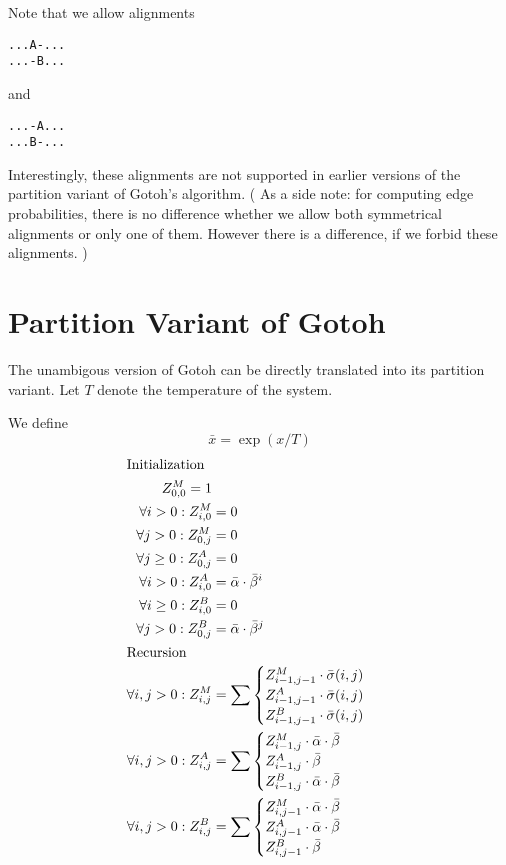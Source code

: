 \documentclass{article}
\begin{document}
Note that we allow alignments
\begin{verbatim}
...A-...
...-B...
\end{verbatim}
and
\begin{verbatim}
...-A...
...B-...
\end{verbatim}
Interestingly, these alignments are not supported in earlier versions of the
partition variant of Gotoh's algorithm. ( As a side note: for computing edge
probabilities, there is no difference whether we allow both symmetrical
alignments or only one of them. However there is a difference, if we forbid
these alignments. )

\section{Partition Variant of Gotoh}

The unambigous version of Gotoh can be directly translated into its partition
variant. Let $T$ denote the temperature of the system.

\newcommand{\ef}[1]{\bar#1}
We define
\begin{displaymath}
  \ef{x} = \exp(x/T)
\end{displaymath}
%
\begin{align*}
\intertext{Initialization}
Z^M_{0,0} = 1\\
\forall i>0: Z^M_{i,0} &= 0\\
\forall j>0: Z^M_{0,j} &= 0\\
%
\forall j\geq 0: Z^A_{0,j} &= 0\\
\forall i>0: Z^A_{i,0} &= \ef{\alpha}\cdot\ef{\beta}^i\\
%
\forall i\geq 0: Z^B_{i,0} &= 0\\
\forall j>0: Z^B_{0,j} &= \ef{\alpha}\cdot\ef{\beta}^j\\
%
\intertext{Recursion}
  \forall i,j>0: Z^M_{i,j} & = \sum
  \begin{cases}
    Z^M_{i-1,j-1} \cdot \ef{\sigma(i,j)} \\
    Z^A_{i-1,j-1} \cdot \ef{\sigma(i,j)} \\
    Z^B_{i-1,j-1} \cdot \ef{\sigma(i,j)} \\
  \end{cases}
\\
  \forall i,j>0: Z^A_{i,j} & = \sum
  \begin{cases}
    Z^M_{i-1,j} \cdot \ef{\alpha} \cdot \ef{\beta} \\
    Z^A_{i-1,j} \cdot \ef{\beta} \\
    Z^B_{i-1,j} \cdot \ef{\alpha} \cdot \ef{\beta} \\
  \end{cases}
\\
  \forall i,j>0: Z^B_{i,j} & = \sum
  \begin{cases}
    Z^M_{i,j-1} \cdot \ef{\alpha} \cdot \ef{\beta} \\
    Z^A_{i,j-1} \cdot \ef{\alpha} \cdot \ef{\beta} \\
    Z^B_{i,j-1} \cdot \ef{\beta} \\
  \end{cases}
\end{align*}
\end{document}
